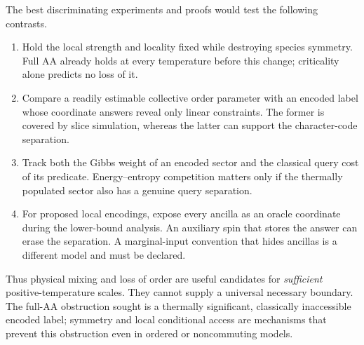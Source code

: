 The best discriminating experiments and proofs would test the following
contrasts.
\begin{enumerate}
\item
Hold the local strength and locality fixed while destroying species
symmetry. Full AA already holds at every temperature before this change;
criticality alone predicts no loss of it.
\item
Compare a readily estimable collective order parameter with an encoded
label whose coordinate answers reveal only linear constraints. The
former is covered by slice simulation, whereas the latter can support
the character-code separation.
\item
Track both the Gibbs weight of an encoded sector and the classical
query cost of its predicate. Energy--entropy competition matters only
if the thermally populated sector also has a genuine query separation.
\item
For proposed local encodings, expose every ancilla as an oracle
coordinate during the lower-bound analysis. An auxiliary spin that
stores the answer can erase the separation. A marginal-input convention
that hides ancillas is a different model and must be declared.
\end{enumerate}

Thus physical mixing and loss of order are useful candidates for
\emph{sufficient} positive-temperature scales. They cannot supply a
universal necessary boundary. The full-AA obstruction sought is a
thermally significant, classically inaccessible encoded label; symmetry
and local conditional access are mechanisms that prevent this
obstruction even in ordered or noncommuting models.
